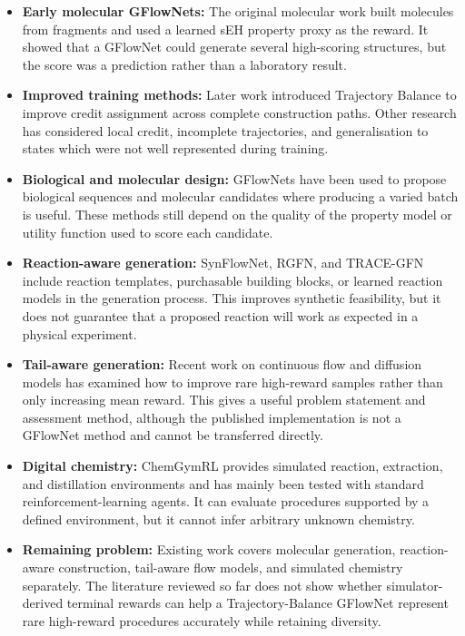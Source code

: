 \documentclass{article}
\begin{document}
\begin{itemize}
    \item \textbf{Early molecular GFlowNets:} The original molecular work built molecules from fragments and used a learned sEH property proxy as the reward. It showed that a GFlowNet could generate several high-scoring structures, but the score was a prediction rather than a laboratory result.
    \item \textbf{Improved training methods:} Later work introduced Trajectory Balance to improve credit assignment across complete construction paths. Other research has considered local credit, incomplete trajectories, and generalisation to states which were not well represented during training.
    \item \textbf{Biological and molecular design:} GFlowNets have been used to propose biological sequences and molecular candidates where producing a varied batch is useful. These methods still depend on the quality of the property model or utility function used to score each candidate.
    \item \textbf{Reaction-aware generation:} SynFlowNet, RGFN, and TRACE-GFN include reaction templates, purchasable building blocks, or learned reaction models in the generation process. This improves synthetic feasibility, but it does not guarantee that a proposed reaction will work as expected in a physical experiment.
    \item \textbf{Tail-aware generation:} Recent work on continuous flow and diffusion models has examined how to improve rare high-reward samples rather than only increasing mean reward. This gives a useful problem statement and assessment method, although the published implementation is not a GFlowNet method and cannot be transferred directly.
    \item \textbf{Digital chemistry:} ChemGymRL provides simulated reaction, extraction, and distillation environments and has mainly been tested with standard reinforcement-learning agents. It can evaluate procedures supported by a defined environment, but it cannot infer arbitrary unknown chemistry.
    \item \textbf{Remaining problem:} Existing work covers molecular generation, reaction-aware construction, tail-aware flow models, and simulated chemistry separately. The literature reviewed so far does not show whether simulator-derived terminal rewards can help a Trajectory-Balance GFlowNet represent rare high-reward procedures accurately while retaining diversity.
\end{itemize}
\end{document}
